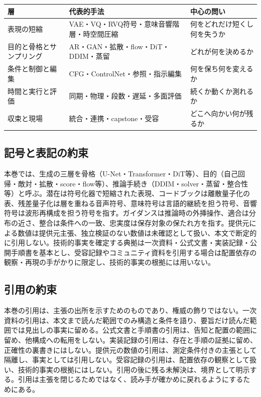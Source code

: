 \documentclass[lualatex,a4paper,10pt]{jlreq}
\begin{document}
\begin{center}
\small
\begin{tabularx}{\textwidth}{@{}p{}p{}X@{}}
\toprule
層 & 代表的手法 & 中心の問い \\
\midrule
表現の短縮 & VAE・VQ・RVQ符号・意味音響階層・時空間圧縮 & 何をどれだけ短くし何を失うか \\
目的と骨格とサンプリング & AR・GAN・拡散・flow・DiT・DDIM・蒸留 & どれが何を決めるか \\
条件と制御と編集 & CFG・ControlNet・参照・指示編集 & 何を保ち何を変えるか \\
時間と実行と評価 & 同期・物理・段数・遅延・多面評価 & 続くか動くか測れるか \\
収束と現場 & 統合・連携・capstone・受容 & どこへ向かい何が残るか \\
\bottomrule
\end{tabularx}
\end{center}

\subsection*{記号と表記の約束}
本巻では、生成の三層を骨格（U-Net・Transformer・DiT等）、目的（自己回帰・敵対・拡散・score・flow等）、推論手続き（DDIM・solver・蒸留・整合性等）と呼ぶ。潜在は符号化器で短縮された表現、コードブックは離散量子化の表、残差量子化は層を重ねる音声符号、意味符号は言語的継続を担う符号、音響符号は波形再構成を担う符号を指す。ガイダンスは推論時の外挿操作、適合は分布の近さ、整合は条件への一致、忠実度は保存対象の保たれ方を指す。提供元による数値は提供元主張、独立検証のない数値は未確認として扱い、本文で断定的に引用しない。技術的事実を確定する典拠は一次資料・公式文書・実装記録・公開手順書を基本とし、受容記録やコミュニティ資料を引用する場合は配置依存の観察・再現の手がかりに限定し、技術的事実の根拠には用いない。

\subsection*{引用の約束}
本巻の引用は、主張の出所を示すためのものであり、権威の飾りではない。一次資料の引用は、本文まで読んだ範囲でのみ構造と条件を語り、要旨だけ読んだ範囲では見出しの事実に留める。公式文書と手順書の引用は、告知と配置の範囲に留め、他構成への転用をしない。実装記録の引用は、存在と手順の証拠に留め、正確性の裏書きにはしない。提供元の数値の引用は、測定条件付きの主張として隔離し、事実としては引用しない。受容記録の引用は、配置依存の観察として扱い、技術的事実の根拠にはしない。引用の後に残る未解決は、境界として明示する。引用は主張を閉じるためではなく、読み手が確かめに戻れるようにするためにある。
\end{document}
